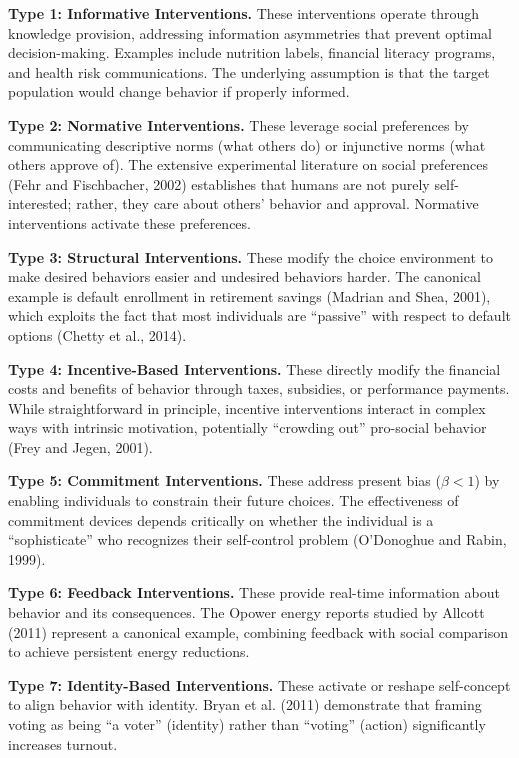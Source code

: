 \documentclass[12pt,a4paper]{article}
\begin{document}
\textbf{Type 1: Informative Interventions.} These interventions operate through knowledge provision, addressing information asymmetries that prevent optimal decision-making. Examples include nutrition labels, financial literacy programs, and health risk communications. The underlying assumption is that the target population would change behavior if properly informed.

\textbf{Type 2: Normative Interventions.} These leverage social preferences by communicating descriptive norms (what others do) or injunctive norms (what others approve of). The extensive experimental literature on social preferences (Fehr and Fischbacher, 2002) establishes that humans are not purely self-interested; rather, they care about others' behavior and approval. Normative interventions activate these preferences.

\textbf{Type 3: Structural Interventions.} These modify the choice environment to make desired behaviors easier and undesired behaviors harder. The canonical example is default enrollment in retirement savings (Madrian and Shea, 2001), which exploits the fact that most individuals are ``passive'' with respect to default options (Chetty et al., 2014).

\textbf{Type 4: Incentive-Based Interventions.} These directly modify the financial costs and benefits of behavior through taxes, subsidies, or performance payments. While straightforward in principle, incentive interventions interact in complex ways with intrinsic motivation, potentially ``crowding out'' pro-social behavior (Frey and Jegen, 2001).

\textbf{Type 5: Commitment Interventions.} These address present bias ($\beta < 1$) by enabling individuals to constrain their future choices. The effectiveness of commitment devices depends critically on whether the individual is a ``sophisticate'' who recognizes their self-control problem (O'Donoghue and Rabin, 1999).

\textbf{Type 6: Feedback Interventions.} These provide real-time information about behavior and its consequences. The Opower energy reports studied by Allcott (2011) represent a canonical example, combining feedback with social comparison to achieve persistent energy reductions.

\textbf{Type 7: Identity-Based Interventions.} These activate or reshape self-concept to align behavior with identity. Bryan et al. (2011) demonstrate that framing voting as being ``a voter'' (identity) rather than ``voting'' (action) significantly increases turnout.
\end{document}
